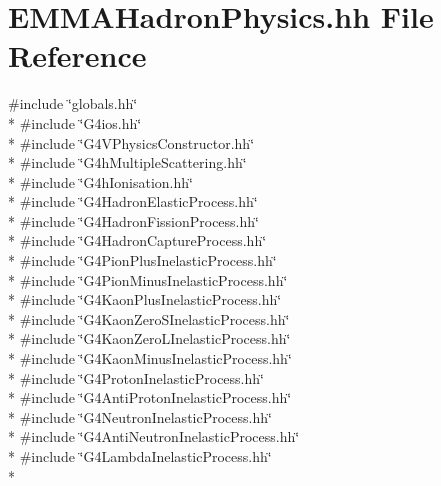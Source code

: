 \hypertarget{EMMAHadronPhysics_8hh}{}\section{E\+M\+M\+A\+Hadron\+Physics.\+hh File Reference}
\label{EMMAHadronPhysics_8hh}
{\ttfamily \#include \char`\"{}globals.\+hh\char`\"{}}\\*
{\ttfamily \#include \char`\"{}G4ios.\+hh\char`\"{}}\\*
{\ttfamily \#include \char`\"{}G4\+V\+Physics\+Constructor.\+hh\char`\"{}}\\*
{\ttfamily \#include \char`\"{}G4h\+Multiple\+Scattering.\+hh\char`\"{}}\\*
{\ttfamily \#include \char`\"{}G4h\+Ionisation.\+hh\char`\"{}}\\*
{\ttfamily \#include \char`\"{}G4\+Hadron\+Elastic\+Process.\+hh\char`\"{}}\\*
{\ttfamily \#include \char`\"{}G4\+Hadron\+Fission\+Process.\+hh\char`\"{}}\\*
{\ttfamily \#include \char`\"{}G4\+Hadron\+Capture\+Process.\+hh\char`\"{}}\\*
{\ttfamily \#include \char`\"{}G4\+Pion\+Plus\+Inelastic\+Process.\+hh\char`\"{}}\\*
{\ttfamily \#include \char`\"{}G4\+Pion\+Minus\+Inelastic\+Process.\+hh\char`\"{}}\\*
{\ttfamily \#include \char`\"{}G4\+Kaon\+Plus\+Inelastic\+Process.\+hh\char`\"{}}\\*
{\ttfamily \#include \char`\"{}G4\+Kaon\+Zero\+S\+Inelastic\+Process.\+hh\char`\"{}}\\*
{\ttfamily \#include \char`\"{}G4\+Kaon\+Zero\+L\+Inelastic\+Process.\+hh\char`\"{}}\\*
{\ttfamily \#include \char`\"{}G4\+Kaon\+Minus\+Inelastic\+Process.\+hh\char`\"{}}\\*
{\ttfamily \#include \char`\"{}G4\+Proton\+Inelastic\+Process.\+hh\char`\"{}}\\*
{\ttfamily \#include \char`\"{}G4\+Anti\+Proton\+Inelastic\+Process.\+hh\char`\"{}}\\*
{\ttfamily \#include \char`\"{}G4\+Neutron\+Inelastic\+Process.\+hh\char`\"{}}\\*
{\ttfamily \#include \char`\"{}G4\+Anti\+Neutron\+Inelastic\+Process.\+hh\char`\"{}}\\*
{\ttfamily \#include \char`\"{}G4\+Lambda\+Inelastic\+Process.\+hh\char`\"{}}\\*
